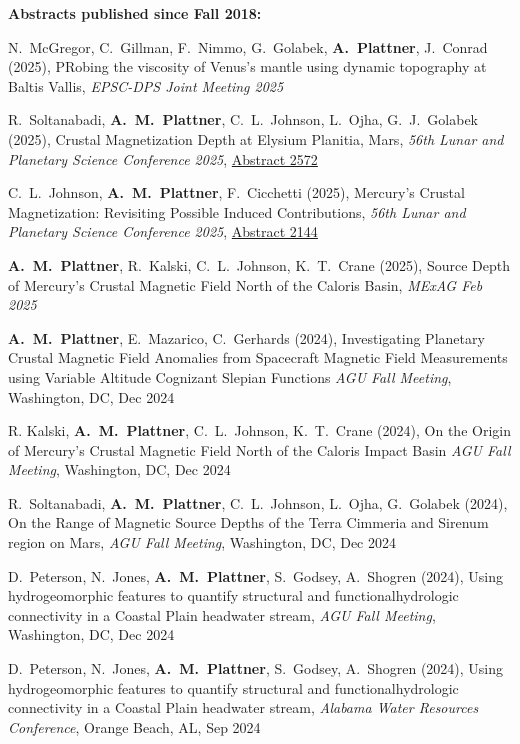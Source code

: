 \documentclass[10pt]{article}
\begin{document}
\spc
\textbf{\tsize Abstracts published since Fall 2018:}

\spcp
N.\ McGregor, C.\ Gillman, F.\ Nimmo, G.\ Golabek, \textbf{A.\ Plattner}, J.\ Conrad (2025), PRobing the viscosity of Venus's mantle using dynamic topography at Baltis Vallis, \emph{EPSC-DPS Joint Meeting 2025}

\spcp
R.\ Soltanabadi, \textbf{A.~M.~Plattner}, C.\ L.\ Johnson, L.\ Ojha, G.\ J.\ Golabek (2025), Crustal Magnetization Depth at Elysium Planitia, Mars, \emph{56th Lunar and Planetary Science Conference 2025}, \href{https://www.hou.usra.edu/meetings/lpsc2025/pdf/2572.pdf}{Abstract 2572}

\spcp
C.\ L.\ Johnson, \textbf{A.~M.~Plattner}, F.\ Cicchetti  (2025), Mercury's Crustal Magnetization: Revisiting Possible Induced Contributions, \emph{56th Lunar and Planetary Science Conference 2025}, \href{https://www.hou.usra.edu/meetings/lpsc2025/pdf/2144.pdf}{Abstract 2144}

\spcp  \textbf{A.~M.~Plattner}, R.\ Kalski, C.\ L.\ Johnson, K.\ T.\ Crane (2025), Source Depth of Mercury's Crustal Magnetic Field North of the Caloris Basin, \emph{MExAG Feb 2025} 

\spcp
\textbf{A.\ M.\ Plattner}, E.\ Mazarico, C.\ Gerhards (2024), Investigating
Planetary Crustal Magnetic Field Anomalies from Spacecraft Magnetic
Field Measurements using Variable Altitude Cognizant Slepian Functions
\emph{AGU Fall Meeting}, Washington, DC, Dec 2024

\spcp R. Kalski, \textbf{A.\ M.\ Plattner}, C.\ L.\ Johnson,
K.\ T.\ Crane (2024), On the Origin of Mercury's Crustal Magnetic Field North
of the Caloris Impact Basin \emph{AGU Fall Meeting}, Washington, DC,
Dec 2024

\spcp R.\ Soltanabadi, \textbf{A.\ M.\ Plattner}, C.\ L.\ Johnson,
L.\ Ojha, G.\ Golabek (2024), On the Range of Magnetic Source Depths of the
Terra Cimmeria and Sirenum region on Mars, \emph{AGU Fall Meeting},
Washington, DC, Dec 2024

\spcp D.\ Peterson, N.\ Jones, \textbf{A.\ M.\ Plattner}, S.\ Godsey, A.\ Shogren (2024), Using hydrogeomorphic features to quantify structural and functionalhydrologic connectivity in a Coastal Plain headwater stream, \emph{AGU Fall Meeting}, Washington, DC, Dec 2024

\spcp D.\ Peterson, N.\ Jones, \textbf{A.\ M.\ Plattner}, S.\ Godsey, A.\ Shogren (2024), Using hydrogeomorphic features to quantify structural and functionalhydrologic connectivity in a Coastal Plain headwater stream, \emph{Alabama Water Resources Conference}, Orange Beach, AL, Sep 2024
\end{document}
